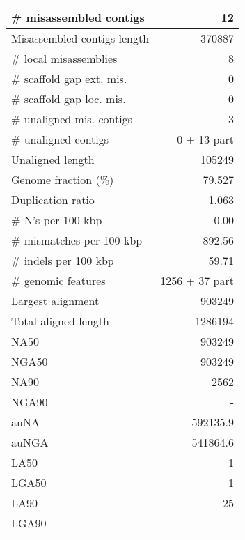 \documentclass[12pt,a4paper]{article}
\begin{document}
\begin{table}[ht]
\begin{center}
\begin{tabular}{|l*{1}{|r}|}
\# misassembled contigs & 12 \\ \hline
Misassembled contigs length & 370887 \\ \hline
\# local misassemblies & 8 \\ \hline
\# scaffold gap ext. mis. & 0 \\ \hline
\# scaffold gap loc. mis. & 0 \\ \hline
\# unaligned mis. contigs & 3 \\ \hline
\# unaligned contigs & 0 + 13 part \\ \hline
Unaligned length & 105249 \\ \hline
Genome fraction (\%) & 79.527 \\ \hline
Duplication ratio & 1.063 \\ \hline
\# N's per 100 kbp & 0.00 \\ \hline
\# mismatches per 100 kbp & 892.56 \\ \hline
\# indels per 100 kbp & 59.71 \\ \hline
\# genomic features & 1256 + 37 part \\ \hline
Largest alignment & 903249 \\ \hline
Total aligned length & 1286194 \\ \hline
NA50 & 903249 \\ \hline
NGA50 & 903249 \\ \hline
NA90 & 2562 \\ \hline
NGA90 & - \\ \hline
auNA & 592135.9 \\ \hline
auNGA & 541864.6 \\ \hline
LA50 & 1 \\ \hline
LGA50 & 1 \\ \hline
LA90 & 25 \\ \hline
LGA90 & - \\ \hline
\end{tabular}
\end{center}
\end{table}
\end{document}
